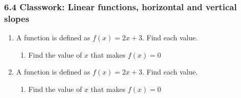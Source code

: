 

\fancyhead[LE]{\thepage}



\subsubsection*{6.4 Classwork: Linear functions, horizontal and vertical slopes}
\begin{enumerate}
\item A function is defined as $f(x)=2x+3$. Find each value.
\begin{enumerate}
  \vspace{0.5cm}
  \item Find the value of $x$ that makes $f(x)=0$
\end{enumerate} \vspace{2cm}

  
\item A function is defined as $f(x)=2x+3$. Find each value.
\begin{enumerate}
  \vspace{0.5cm}
  \item Find the value of $x$ that makes $f(x)=0$
\end{enumerate} \vspace{2cm}


\end{enumerate}
